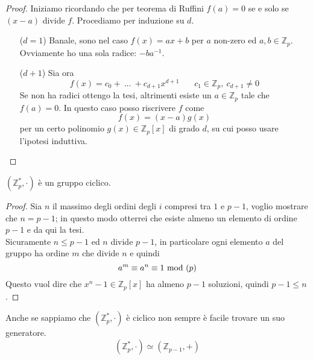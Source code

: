\begin{proof}
	Iniziamo ricordando che per teorema di Ruffini $f(a)=0$ se e solo se $(x-a)$ divide $f$. Procediamo per induzione su $d$.
	\begin{itemize}
		\item[($d=1$)] Banale, sono nel caso $f(x)=ax+b$ per $a$ non-zero ed $a,b\in\mathbb{Z}_p$. \\ Ovviamente ho una sola radice: $-ba^{-1}$.
		\item[($d+1$)] Sia ora 
		\begin{equation*}
		f(x)=c_0+\ \dots\ +c_{d+1}x^{d+1}  \ \ \ \ \ \ \ \ c_1\in\mathbb{Z}_p,\ c_{d+1}\neq 0
		\end{equation*}
		Se non ha radici ottengo la tesi, altrimenti esiste un $a\in\mathbb{Z}_p$ tale che $f(a)=0$. In questo caso posso riscrivere $f$ come 
		\begin{equation*}
		f(x)=(x-a)g(x)
		\end{equation*}
		per un certo polinomio $g(x)\in\mathbb{Z}_p[x]$ di grado $d$, su cui posso usare l'ipotesi induttiva.
	\end{itemize}
\end{proof}
\begin{teorema}
	$\left(\mathbb{Z}_p^*,\cdot\right)$ è un gruppo ciclico.
\end{teorema}
\begin{proof}
	Sia $n$ il massimo degli ordini degli $i$ compresi tra $1$ e $p-1$, voglio mostrare che $n=p-1$; in questo modo otterrei che esiste almeno un elemento di ordine $p-1$ e da qui la tesi. \\ Sicuramente $n\leq p-1$ ed $n$ divide $p-1$, in particolare ogni elemento $a$ del gruppo ha ordine $m$ che divide $n$ e quindi
	\begin{equation*}
	a^m\equiv a^n\equiv 1\ \mathrm{mod}\ (p) 
	\end{equation*}
	Questo vuol dire che $x^n-1\in\mathbb{Z}_p[x]$ ha almeno $p-1$ soluzioni, quindi $p-1\leq n$.
\end{proof}
\begin{osservazione}
	Anche se sappiamo che $\left(\mathbb{Z}_p^*,\cdot\right)$ è ciclico non sempre è facile trovare un suo generatore. 
	\begin{equation*}
	\left(\mathbb{Z}_p^*,\cdot\right)\simeq\left(\mathbb{Z}_{p-1},+\right)
	\end{equation*}
\end{osservazione}

